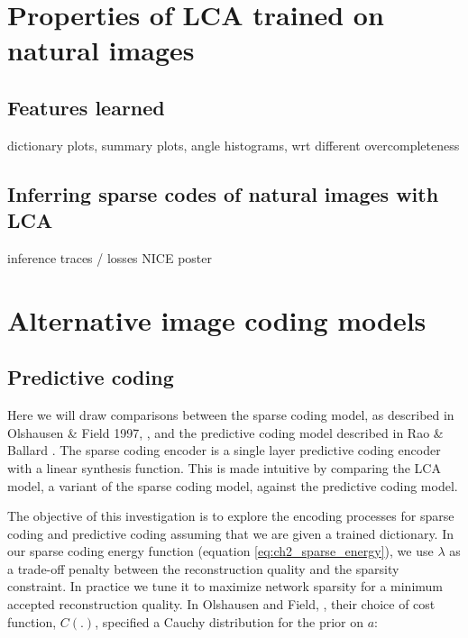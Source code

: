 \section{Properties of LCA trained on natural images}
\subsection{Features learned}
dictionary plots, summary plots, angle histograms, wrt different overcompleteness


\subsection{Inferring sparse codes of natural images with LCA}\label{sec:ch2_lca_inference}
inference traces / losses
NICE poster


\section{Alternative image coding models}\label{sec:ch2_alternative_image_coding_models}


%
%


\subsection{Predictive coding}
Here we will draw comparisons between the sparse coding model, as described in Olshausen \& Field 1997, \citeyearpar{olshausen1997sparse}, and the predictive coding model described in Rao \& Ballard \citeyearpar{rao1999predictive}. The sparse coding encoder is a single layer predictive coding encoder with a linear synthesis function. This is made intuitive by comparing the LCA model, a variant of the sparse coding model, against the predictive coding model.

The objective of this investigation is to explore the encoding processes for sparse coding and predictive coding assuming that we are given a trained dictionary. In our sparse coding energy function (equation \eqref{eq:ch2_sparse_energy}), we use $\lambda$ as a trade-off penalty between the reconstruction quality and the sparsity constraint. In practice we tune it to maximize network sparsity for a minimum accepted reconstruction quality. In Olshausen and Field, \citeyearpar{olshausen1997sparse}, their choice of cost function, $C(.)$, specified a Cauchy distribution for the prior on $a$:

